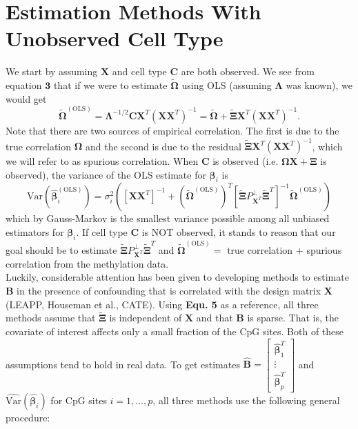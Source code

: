 \documentclass{article}
\begin{document}
\section{Estimation Methods With Unobserved Cell Type}
We start by assuming $\bm{X}$ and cell type $\bm{C}$ are both observed. We see from equation $\bm{3}$ that if we were to estimate $\tilde{\bm{\Omega}}$ using OLS (assuming $\bm{\Lambda}$ was known), we would get
\begin{equation}
\tilde{\bm{\Omega}}^{(\text{OLS})} = \bm{\Lambda}^{-1/2}\bm{C}\bm{X}^T \left( \bm{X}\bm{X}^T \right)^{-1} = \tilde{\bm{\Omega}} + \tilde{\bm{\Xi}}\bm{X}^T \left( \bm{X}\bm{X}^T \right)^{-1}.
\end{equation} 
Note that there are two sources of empirical correlation. The first is due to the true correlation $\bm{\Omega}$ and the second is due to the residual $\tilde{\bm{\Xi}}\bm{X}^T \left( \bm{X}\bm{X}^T \right)^{-1}$, which we will refer to as spurious correlation. When $\bm{C}$ is observed (i.e. $\bm{\Omega} \bm{X} + \bm{\Xi}$ is observed), the variance of the OLS estimate for $\bm{\beta}_i$ is
\begin{equation}
\text{Var}\left( \hat{\bm{\beta}}_i^{(\text{OLS})} \right) = \sigma_i^2\left( \left[ \bm{X}\bm{X}^T \right]^{-1} + \left( \tilde{\bm{\Omega}}^{(\text{OLS})}\right)^T \left[ \tilde{\bm{\Xi}} P_{\bm{X}^T}^{\perp}\tilde{\bm{\Xi}}^T \right]^{-1}\tilde{\bm{\Omega}}^{(\text{OLS})} \right)
\end{equation} 
which by Gauss-Markov is the smallest variance possible among all unbiased estimators for $\bm{\beta}_i$. If cell type $\bm{C}$ is NOT observed, it stands to reason that our goal should be to estimate $\tilde{\bm{\Xi}} P_{\bm{X}^T}^{\perp}\tilde{\bm{\Xi}}^T$ and $\tilde{\bm{\Omega}}^{(\text{OLS})} = $ true correlation $+$ spurious correlation from the methylation data.\\
\indent Luckily, considerable attention has been given to developing methods to estimate $\bm{B}$ in the presence of confounding that is correlated with the design matrix $\bm{X}$ (LEAPP, Houseman et al., CATE). Using \textbf{Equ. 5} as a reference, all three methods assume that $\tilde{\bm{\Xi}}$ is independent of $\bm{X}$ and that $\bm{B}$ is sparse. That is, the covariate of interest affects only a small fraction of the CpG sites. Both of these assumptions tend to hold in real data. To get estimates $\hat{\bm{B}} = \left[ \begin{matrix}
\hat{\bm{\beta}}_1^T\\
\vdots\\
\hat{\bm{\beta}}_p^T
\end{matrix} \right]$ and $\hat{\text{Var}}\left( \hat{\bm{\beta}}_i \right)$ for CpG sites $i = 1, \ldots, p$, all three methods use the following general procedure:
\end{document}
